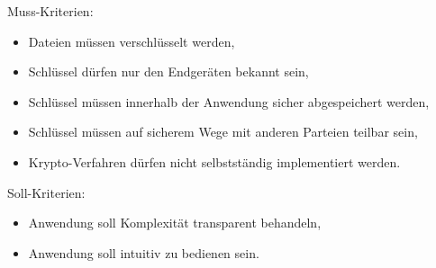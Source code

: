 \documentclass[10pt, a4paper,headsepline,pointednumbers]{scrreprt}
\begin{document}
Muss-Kriterien:
\begin{itemize}
\item Dateien müssen verschlüsselt werden,
\item Schlüssel dürfen nur den Endgeräten bekannt sein,
\item Schlüssel müssen innerhalb der Anwendung sicher abgespeichert werden,
\item Schlüssel müssen auf sicherem Wege mit anderen Parteien teilbar sein,
\item Krypto-Verfahren dürfen nicht selbstständig implementiert werden.
\end{itemize}
Soll-Kriterien:
\begin{itemize}
\item Anwendung soll Komplexität transparent behandeln,
\item Anwendung soll intuitiv zu bedienen sein.
\end{itemize}
\end{document}
